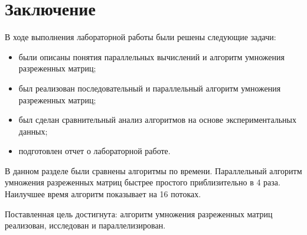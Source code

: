 \chapter*{Заключение}

В ходе выполнения лабораторной работы были решены следующие задачи:
\begin{itemize}
	\item были описаны понятия параллельных вычислений и алгоритм умножения разреженных матриц;
	\item был реализован последовательный и параллельный алгоритм умножения разреженных матриц;
	\item был сделан сравнительный анализ алгоритмов на основе экспериментальных данных;
	\item подготовлен отчет о лабораторной работе.
\end{itemize}

В данном разделе были сравнены алгоритмы по времени. Параллельный алгоритм умножения разреженных матриц быстрее простого приблизительно в 4 раза. Наилучшее время алгоритм показывает на 16 потоках.

Поставленная цель достигнута: алгоритм умножения разреженных матриц реализован, исследован и параллелизирован.